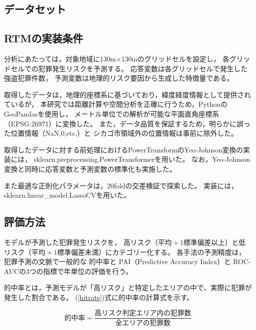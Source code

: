 \subsection{データセット}


\subsection{RTMの実装条件}
分析にあたっては，対象地域に130m×130mのグリッドセルを設定し，
各グリッドセルでの犯罪発生リスクを予測する。
応答変数は各グリッドセルで発生した強盗犯罪件数，
予測変数は地理的リスク要因から生成した特徴量である。

取得したデータは，地理的座標系に基づいており，緯度経度情報として提供されているが，
本研究では距離計算や空間分析を正確に行うため，PythonのGeoPandas\cite{geopandas}を使用し，
メートル単位での解析が可能な平面直角座標系（EPSG:26971）に変換した。
また，データ品質を保証するため，明らかに誤った位置情報（NaN,0,etc.）と
シカゴ市領域外の位置情報は事前に除外した。

取得したデータに対する前処理におけるPowerTransformのYeo-Johnson変換の実装には，
sklearn.preprocessing.PowerTransformer\cite{scikit-learn}を用いた。
なお，Yeo-Johnson変換と同時に応答変数と予測変数の標準化も実施した。

また最適な正則化パラメータは，20foldの交差検証\cite{islp}で探索した。
実装には，sklearn.linear\_model.LassoCV\cite{scikit-learn}を用いた。
\subsection{評価方法}
モデルが予測した犯罪発生リスクを，
高リスク（$平均+1標準偏差以上$）と低リスク（$平均+1標準偏差未満$）にカテゴリー化する。
各手法の予測精度は，犯罪予測の文脈で一般的な
的中率\cite{joshi2020considerationsdevelopingpredictivemodels}と
PAI（Predictive Accuracy Index）\cite{chainey2008utility}と
ROC-AUC\cite{islp}の3つの指標で年単位の評価を行う。

的中率とは，予測モデルが「高リスク」と特定したエリアの中で、実際に犯罪が発生した割合である。
(\ref{hitrate})式に的中率の計算式を示す。

\begin{equation}\label{hitrate}
  的中率=\frac{高リスク判定エリア内の犯罪数}{全エリアの犯罪数}
\end{equation}

